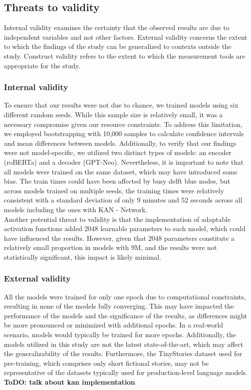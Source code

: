 \subsection{Threats to validity}
Internal validity examines the certainty that the observed results are due to independent variables and not other factors. External validity concerns the extent to which the findings of the study can be generalized to contexts outside the study. Construct validity refers to the extent to which the measurement tools are appropriate for the study. 

\subsubsection{Internal validity}
To ensure that our results were not due to chance, we trained models using six different random seeds. While this sample size is relatively small, it was a necessary compromise given our resource constraints. To address this limitation, we employed bootstrapping with 10,000 samples to calculate confidence intervals and mean differences between models. Additionally, to verify that our findings were not model-specific, we utilized two distinct types of models: an encoder (roBERTa) and a decoder (GPT-Neo). Nevertheless, it is important to note that all models were trained on the same dataset, which may have introduced some bias. The train times could have been affected by busy delft blue nodes, but across models trained on multiple seeds, the training times were relatively consistent with a standard deviation of only 9 minutes and 52 seconds across all models including the ones with KAN - Network. \\ 
Another potential threat to validity is that the implementation of adaptable activation functions added 2048 learnable parameters to each model, which could have influenced the results. However, given that 2048 parameters constitute a relatively small proportion in models with 9M, and the results were not statistically significant, this impact is likely minimal.

\subsubsection{External validity}
All the models were trained for only one epoch due to computational constraints, resulting in none of the models fully converging. This may have impacted the performance of the models and the significance of the results, as differences might be more pronounced or minimized with additional epochs. In a real-world scenario, models would typically be trained for more epochs. Additionally, the models utilized in this study are not the latest state-of-the-art, which may affect the generalizability of the results. Furthermore, the TinyStories dataset used for pre-training, which comprises only short fictional stories, may not be representative of the datasets typically used for production-level language models.
\textbf{ToDO: talk about kan implementation}
